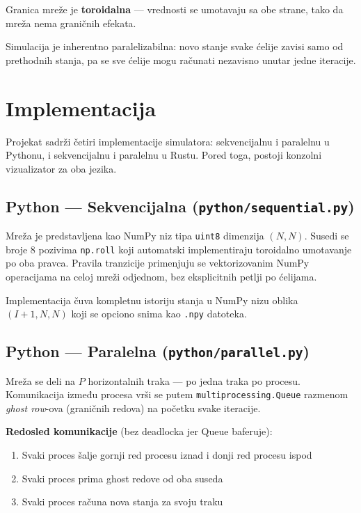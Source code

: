 \documentclass[12pt,a4paper]{article}
\begin{document}
Granica mreže je \textbf{toroidalna} --- vrednosti se umotavaju sa obe strane, tako da mreža
nema graničnih efekata.

Simulacija je inherentno paralelizabilna: novo stanje svake ćelije zavisi samo od prethodnih
stanja, pa se sve ćelije mogu računati nezavisno unutar jedne iteracije.

\section{Implementacija}

Projekat sadrži četiri implementacije simulatora: sekvencijalnu i paralelnu u Pythonu, i
sekvencijalnu i paralelnu u Rustu. Pored toga, postoji konzolni vizualizator za oba jezika.

\subsection{Python --- Sekvencijalna (\texttt{python/sequential.py})}

Mreža je predstavljena kao NumPy niz tipa \texttt{uint8} dimenzija $(N, N)$.
Susedi se broje 8 pozivima \texttt{np.roll} koji automatski implementiraju toroidalno umotavanje
po oba pravca. Pravila tranzicije primenjuju se vektorizovanim NumPy operacijama na celoj mreži
odjednom, bez eksplicitnih petlji po ćelijama.

Implementacija čuva kompletnu istoriju stanja u NumPy nizu oblika $(I+1, N, N)$
koji se opciono snima kao \texttt{.npy} datoteka.

\subsection{Python --- Paralelna (\texttt{python/parallel.py})}

Mreža se deli na $P$ horizontalnih traka --- po jedna traka po procesu.
Komunikacija između procesa vrši se putem \texttt{multiprocessing.Queue} razmenom
\emph{ghost row}-ova (graničnih redova) na početku svake iteracije.

\textbf{Redosled komunikacije} (bez deadlocka jer Queue baferuje):
\begin{enumerate}[noitemsep]
    \item Svaki proces šalje gornji red procesu iznad i donji red procesu ispod
    \item Svaki proces prima ghost redove od oba suseda
    \item Svaki proces računa nova stanja za svoju traku
\end{enumerate}
\end{document}
